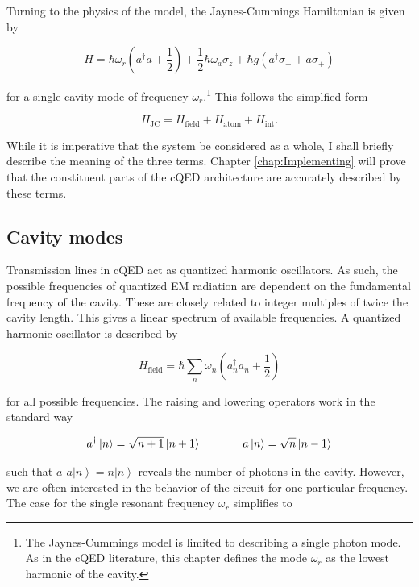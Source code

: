\documentclass[11 pt, oneside]{book} %
\newcommand{\ket}[1]{\left| #1 \right>} %
\begin{document}
Turning to the physics of the model, the Jaynes-Cummings Hamiltonian is given by

\begin{equation}\label{eq:JC}
H=\hbar \omega_r(a^\dag a + \frac{1}{2}) + \frac{1}{2}\hbar \omega_a \sigma_z + \hbar g(a^\dag \sigma_- + a\sigma_+)
\end{equation}

for a single cavity mode of frequency $\omega_r$.\footnote{The Jaynes-Cummings model is limited to describing a single photon mode. As in the cQED literature, this chapter defines the mode $\omega_r$ as the lowest harmonic of the cavity. } This follows the simplfied form

\begin{equation}
H_{\mathrm{JC}} = H_{\mathrm{field}}+H_{\mathrm{atom}}+H_{\mathrm{int}}.
\end{equation}

While it is imperative that the system be considered as a whole, I shall briefly describe the meaning of the three terms. Chapter \ref{chap:Implementing} will prove that the constituent parts of the cQED architecture are accurately described by these terms. 

\subsection{Cavity modes}
Transmission lines in cQED act as quantized harmonic oscillators. As such, the possible frequencies of quantized EM radiation are dependent on the fundamental frequency of the cavity. These are closely related to integer multiples of twice the cavity length. This gives a linear spectrum of available frequencies. A quantized harmonic oscillator is described by 

\begin{equation}\label{eq:CavityHamiltonian}
H_{\mathrm{field}}=\hbar \sum_n\omega_n(a_n^\dag a_n+\frac{1}{2})
\end{equation}

for all possible frequencies. The raising and lowering operators work in the standard way

\begin{equation}
a^\dag\ket{n}=\sqrt{n+1}\ket{n+1} \hspace{1.3cm} a\ket{n}=\sqrt{n}\ket{n-1} 
\end{equation}

such that $a^\dag a\ket{n}=n\ket{n}$ reveals the number of photons in the cavity. However, we are often interested in the behavior of the circuit for one particular frequency. The case for the single resonant  frequency $\omega_r$ simplifies to 
\end{document}
